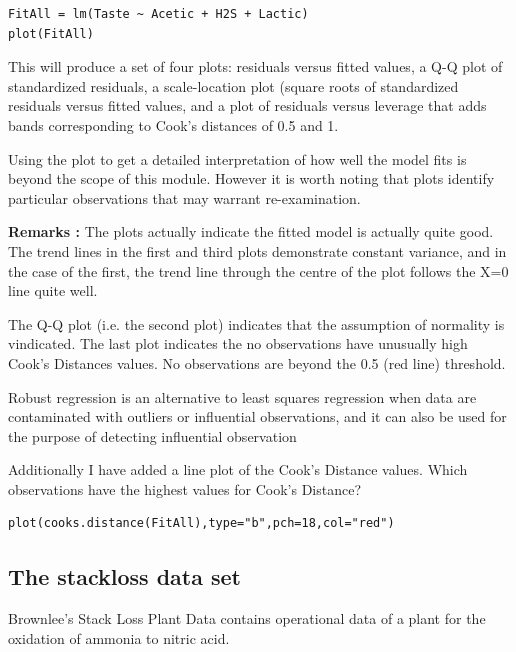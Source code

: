\documentclass[12pt, a4paper]{article}
\theoremstyle{plain}
\theoremstyle{definition}
\theoremstyle{remark}
\begin{document}
\begin{framed}
\begin{verbatim}
FitAll = lm(Taste ~ Acetic + H2S + Lactic)
plot(FitAll)
\end{verbatim}
\end{framed}
This will produce a set of four plots: residuals versus fitted values, a Q-Q plot of standardized residuals, a scale-location plot (square roots of standardized residuals versus fitted values, and a plot of residuals versus leverage that adds bands corresponding to Cook's distances of 0.5 and 1. 

Using the plot to get a detailed interpretation of how well the model fits is beyond the scope of this module. However it is worth noting that plots identify particular observations that may warrant re-examination. 

\textbf{Remarks :} 
The plots actually indicate the fitted model is actually quite good. The trend lines in the first and third plots demonstrate constant variance, and in the case of the first, the trend line through the centre of the plot  follows the X=0 line quite well.

The Q-Q plot (i.e. the second plot) indicates that the assumption of normality is vindicated.
The last plot indicates the no observations have unusually high Cook’s Distances values.  No observations are beyond the 0.5 (red line) threshold.

Robust regression is an alternative to least squares regression when data are contaminated with outliers or influential observations, and it can also be used for the purpose of detecting influential observation


Additionally I have added a line plot of the Cook’s Distance values. Which observations have the highest values for Cook’s Distance?

\begin{framed}
\begin{verbatim}
plot(cooks.distance(FitAll),type="b",pch=18,col="red")
\end{verbatim}
\end{framed}





\subsection{The stackloss data set}
Brownlee's Stack Loss Plant Data contains operational data of a plant for the oxidation of ammonia to nitric acid.
\end{document}
